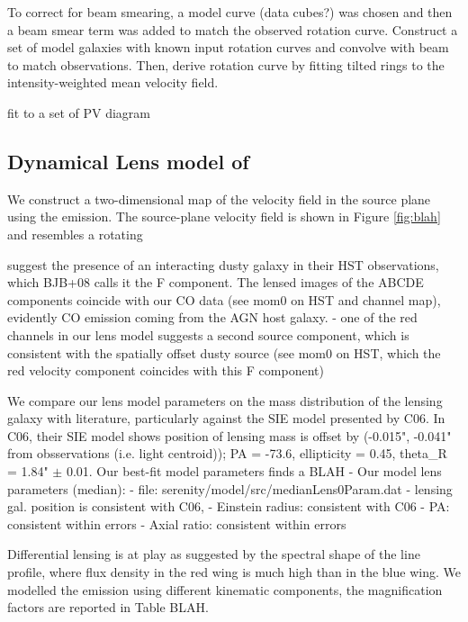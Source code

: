  To correct for beam smearing, a model curve (data cubes?) was chosen and then a beam smear term was added to match the observed 
rotation curve. Construct a set of model galaxies with known input rotation curves and convolve with beam to match 
observations. Then, derive rotation curve by fitting tilted rings to the intensity-weighted mean velocity field.

fit to a set of PV diagram

\subsection{Dynamical Lens model of }
We construct a two-dimensional map of the velocity field in the source plane using the  emission. 
The source-plane velocity field is shown in Figure \ref{fig:blah} and resembles a rotating 

\citet{Claeskens06a} suggest the presence of an interacting dusty galaxy in their HST
observations, which BJB+08 calls it the F component. The lensed images of the
ABCDE
components coincide with our CO data (see mom0 on HST and channel map),
evidently CO emission coming from the AGN host galaxy.
- one of the red channels in our lens model suggests a second source component,
which is consistent with the spatially offset dusty source (see mom0 on HST,
which
the red velocity component coincides with this F component)

We compare our lens model parameters on the mass distribution of the lensing
galaxy with literature, particularly against the SIE model presented by C06.
In C06, their SIE model shows position of lensing mass is offset by (-0.015",
-0.041" from obsservations (i.e. light centroid)); PA = -73.6, ellipticity = 0.45,
theta\_R = 1.84" $\pm$ 0.01.
Our best-fit model parameters finds a BLAH
	- Our model lens parameters (median):
		- file: serenity/model/src/medianLens0Param.dat
		- lensing gal. position is consistent with C06,
		- Einstein radius: consistent with C06
		- PA: consistent within errors
		- Axial ratio: consistent within errors

Differential lensing is at play as suggested by the spectral shape of the  line profile, where
flux density in the red wing is much high than in the blue wing.
We modelled the emission using different kinematic components, the magnification factors are reported in Table BLAH.




